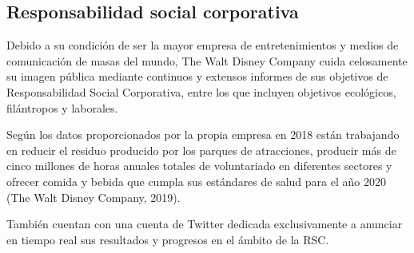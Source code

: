 \subsection{Responsabilidad social corporativa}

Debido a su condición de ser la mayor empresa de entretenimientos y medios de comunicación de masas del mundo, The Walt Disney Company cuida celosamente su imagen pública mediante continuos y extensos informes de sus objetivos de Responsabilidad Social Corporativa, entre los que incluyen objetivos ecológicos, filántropos y laborales.

Según los datos proporcionados por la propia empresa en 2018 están trabajando en reducir el residuo producido por los parques de atracciones, producir más de cinco millones de horas anuales totales de voluntariado en diferentes sectores y ofrecer comida y bebida que cumpla sus estándares de salud para el año 2020 (The Walt Disney Company, 2019).

También cuentan con una cuenta de Twitter dedicada exclusivamente a anunciar en tiempo real sus resultados y progresos en el ámbito de la RSC.